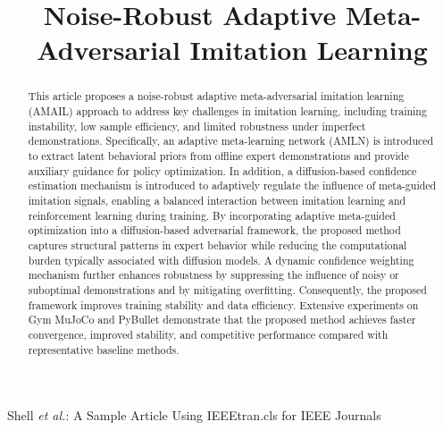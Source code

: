 \documentclass[journal]{IEEEtran}
\begin{document}
\title{Noise-Robust Adaptive Meta-Adversarial Imitation Learning}


\author{}

%
{Shell \MakeLowercase{\textit{et al.}}: A Sample Article Using IEEEtran.cls for IEEE Journals}


\maketitle

\begin{abstract}
This article proposes a noise-robust adaptive meta-adversarial imitation learning (AMAIL) approach to address key challenges in imitation learning, including training instability, low sample efficiency, and limited robustness under imperfect demonstrations. Specifically, an adaptive meta-learning network (AMLN) is introduced to extract latent behavioral priors from offline expert demonstrations and provide auxiliary guidance for policy optimization. In addition, a diffusion-based confidence estimation mechanism is introduced to adaptively regulate the influence of meta-guided imitation signals, enabling a balanced interaction between imitation learning and reinforcement learning during training.
By incorporating adaptive meta-guided optimization into a diffusion-based adversarial framework, the proposed method captures structural patterns in expert behavior while reducing the computational burden typically associated with diffusion models. 
A dynamic confidence weighting mechanism further enhances robustness by suppressing the influence of noisy or suboptimal demonstrations and by mitigating overfitting. Consequently, the proposed framework improves training stability and data efficiency.
Extensive experiments on Gym MuJoCo and PyBullet demonstrate that the proposed method achieves faster convergence, improved stability, and competitive performance compared with representative baseline methods.
\end{abstract}
\end{document}
